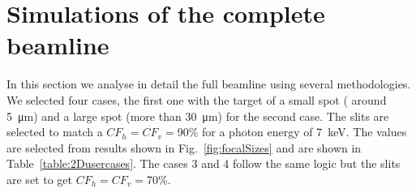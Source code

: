 \documentclass{iucr}              %
\begin{document}


\section{Simulations of the complete beamline}

In this section we analyse in detail the full beamline using several methodologies. We selected four cases, the first one with the target of a small spot ( around \SI{5}{\micro\meter}) and a large spot (more than \SI{30}{\micro\meter}) for the second case.  The slits are selected to match a $CF_h=CF_v=$90\% for a photon energy of \SI{7}{keV}. The values are selected from results shown in Fig.~\ref{fig:focalSizes} and are shown in Table~\ref{table:2Dusercases}. The cases 3 and 4 follow the same logic but the slits are set to get $CF_h=CF_v=$70\%.   
\end{document}
